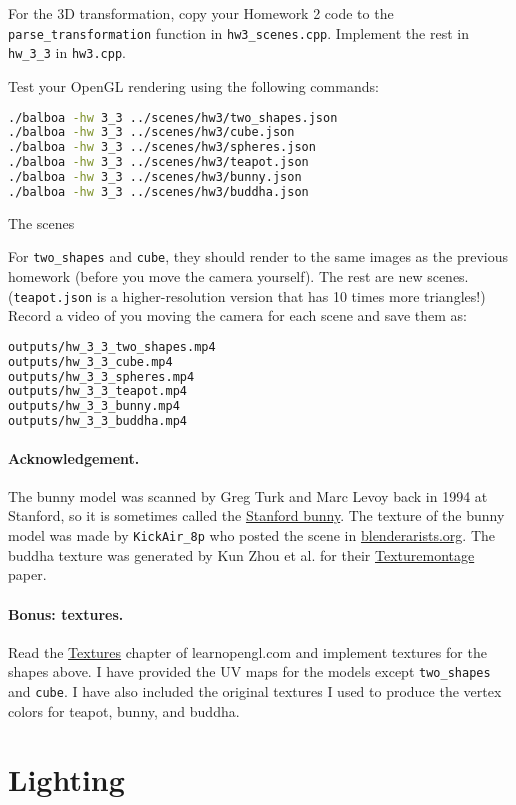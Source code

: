 For the 3D transformation, copy your Homework 2 code to the \lstinline{parse_transformation} function in \lstinline{hw3_scenes.cpp}. Implement the rest in \lstinline{hw_3_3} in \lstinline{hw3.cpp}.

Test your OpenGL rendering using the following commands:
\begin{lstlisting}[language=bash]
./balboa -hw 3_3 ../scenes/hw3/two_shapes.json
./balboa -hw 3_3 ../scenes/hw3/cube.json
./balboa -hw 3_3 ../scenes/hw3/spheres.json
./balboa -hw 3_3 ../scenes/hw3/teapot.json
./balboa -hw 3_3 ../scenes/hw3/bunny.json
./balboa -hw 3_3 ../scenes/hw3/buddha.json
\end{lstlisting}

The scenes 

For \lstinline{two_shapes} and \lstinline{cube}, they should render to the same images as the previous homework (before you move the camera yourself). The rest are new scenes. (\lstinline{teapot.json} is a higher-resolution version that has 10 times more triangles!) Record a video of you moving the camera for each scene and save them as:
\begin{lstlisting}[language=bash]
outputs/hw_3_3_two_shapes.mp4
outputs/hw_3_3_cube.mp4
outputs/hw_3_3_spheres.mp4
outputs/hw_3_3_teapot.mp4
outputs/hw_3_3_bunny.mp4
outputs/hw_3_3_buddha.mp4
\end{lstlisting}

\paragraph{Acknowledgement.} The bunny model was scanned by Greg Turk and Marc Levoy back in 1994 at Stanford, so it is sometimes called the \href{https://en.wikipedia.org/wiki/Stanford_bunny}{Stanford bunny}. The texture of the bunny model was made by \lstinline{KickAir_8p} who posted the scene in \href{https://blenderartists.org/t/uv-unwrapped-stanford-bunny-happy-spring-equinox/1101297}{blenderarists.org}. The buddha texture was generated by Kun Zhou et al. for their \href{http://kunzhou.net/tex-models.htm}{Texturemontage} paper.

\paragraph{Bonus: textures.} Read the \href{https://learnopengl.com/Getting-started/Textures}{Textures} chapter of learnopengl.com and implement textures for the shapes above. I have provided the UV maps for the models except \lstinline{two_shapes} and \lstinline{cube}. I have also included the original textures I used to produce the vertex colors for teapot, bunny, and buddha.

\section{Lighting}

%
%


